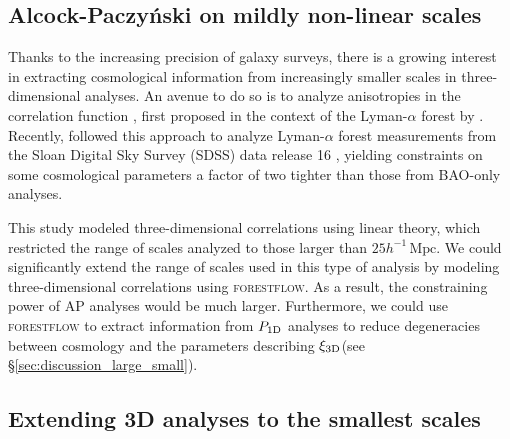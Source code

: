 \documentclass[fleqn,usenatbib]{mnras}
\newcommand{\lyaf}{Lyman-$\alpha$ forest\xspace}
\newcommand{\poned}{\ensuremath{P_{\rm 1D}}\xspace}
\newcommand{\xithreed}{\ensuremath{\xi_{\rm 3D}}\xspace}
\newcommand{\forestflow}{\textsc{forestflow}\xspace}
\newcommand{\hMpc}{h^{-1}\,\mathrm{Mpc}}
\begin{document}

\subsection{Alcock-Paczy\'nski on mildly non-linear scales}

Thanks to the increasing precision of galaxy surveys, there is a growing interest in extracting cosmological information from increasingly smaller scales in three-dimensional analyses. An avenue to do so is to analyze anisotropies in the correlation function \citet[AP test;][]{alcock1979EvolutionFreeTesta}, first proposed in the context of the \lyaf by \citet{1999ApJ...518...24M, hui1999GeometricalTestCosmological}. Recently, \cite{cuceu2023ConstraintsCosmicExpansion} followed this approach to analyze \lyaf measurements from the Sloan Digital Sky Survey (SDSS) data release 16 \citep[DR16;][]{Ahumada2020_DR16}, yielding constraints on some cosmological parameters a factor of two tighter than those from BAO-only analyses. 

This study modeled three-dimensional correlations using linear theory, which restricted the range of scales analyzed to those larger than $25 \hMpc$. We could significantly extend the range of scales used in this type of analysis by modeling three-dimensional correlations using \forestflow. As a result, the constraining power of AP analyses would be much larger. Furthermore, we could use \forestflow to extract information from \poned analyses to reduce degeneracies between cosmology and the parameters describing \xithreed (see \S\ref{sec:discussion_large_small}).


\subsection{Extending 3D analyses to the smallest scales}
\end{document}
